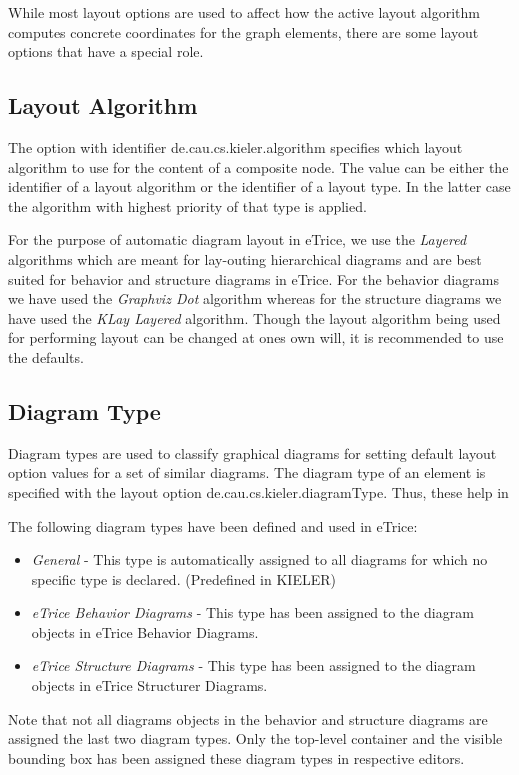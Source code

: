 While most layout options are used to affect how the active layout algorithm computes concrete coordinates 
for the graph elements, there are some layout options that have a special role.

\subsection{Layout Algorithm}

The option with identifier de.cau.cs.kieler.algorithm specifies which layout algorithm to use for the 
content of a composite node. The value can be either the identifier of a layout algorithm or the 
identifier of a layout type. In the latter case the algorithm with highest priority of that type is applied.

For the purpose of automatic diagram layout in eTrice, we use the \textit{Layered} algorithms which are 
meant for lay-outing hierarchical diagrams and are best suited for behavior and structure diagrams in 
eTrice. For the behavior diagrams we have used the \textit{Graphviz Dot} algorithm whereas for the 
structure diagrams we have used the \textit{KLay Layered} algorithm. Though the layout algorithm being 
used for performing layout can be changed at ones own will, it is recommended to use the defaults.  

\subsection{Diagram Type}

Diagram types are used to classify graphical diagrams for setting default layout option values for a set 
of similar diagrams. The diagram type of an element is specified with the layout option 
de.cau.cs.kieler.diagramType. Thus, these help in 

The following diagram types have been defined and used in eTrice:
\begin{itemize}
\item \textit{General} - This type is automatically assigned to all diagrams for which no specific type is 
declared. (Predefined in KIELER)
\item \textit{eTrice Behavior Diagrams} - This type has been assigned to the diagram objects in eTrice 
Behavior Diagrams. 
\item \textit{eTrice Structure Diagrams} - This type has been assigned to the diagram objects in eTrice 
Structurer Diagrams.
\end{itemize}
Note that not all diagrams objects in the behavior and structure diagrams are assigned the last two 
diagram types. Only the top-level container and the visible bounding box has been assigned these diagram 
types in respective editors.


